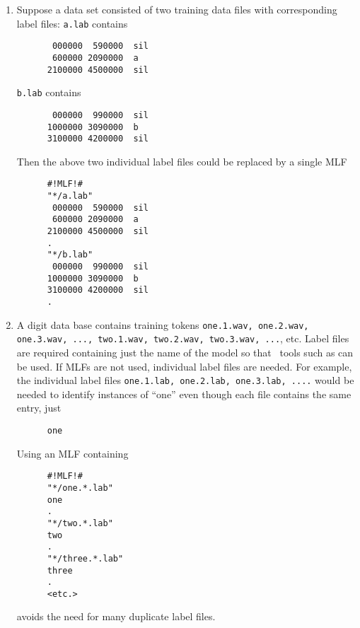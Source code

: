 \begin{enumerate}
\item
Suppose a data set consisted of two training data files with
corresponding label files:
\newline
\texttt{a.lab} contains 
\begin{verbatim}
       000000  590000  sil
       600000 2090000  a
      2100000 4500000  sil
\end{verbatim}
\texttt{b.lab} contains 
\begin{verbatim}
       000000  990000  sil
      1000000 3090000  b
      3100000 4200000  sil
\end{verbatim}
Then the above two individual label files could be replaced by a single MLF
\begin{verbatim}
      #!MLF!#
      "*/a.lab"
       000000  590000  sil
       600000 2090000  a
      2100000 4500000  sil
      .                      
      "*/b.lab"
       000000  990000  sil
      1000000 3090000  b
      3100000 4200000  sil
      .                      
\end{verbatim}

\item
A digit data base contains training tokens \texttt{one.1.wav, one.2.wav, one.3.wav, ...,
two.1.wav, two.2.wav, two.3.wav, ...}, etc.  Label files are required containing
just the name of the model so that \HTK\ tools such as  can be used.
If MLFs are not used, individual label files are needed.  For example,
the individual label files \texttt{one.1.lab, one.2.lab, one.3.lab, ....} would be
needed
to identify instances of ``one'' even though each file contains the same entry, just
\begin{verbatim}
      one
\end{verbatim}
Using an MLF containing
\begin{verbatim}
      #!MLF!#
      "*/one.*.lab"
      one
      .
      "*/two.*.lab"
      two
      .
      "*/three.*.lab"
      three
      .
      <etc.>
\end{verbatim}
avoids the need for many duplicate label files.


\end{enumerate}

